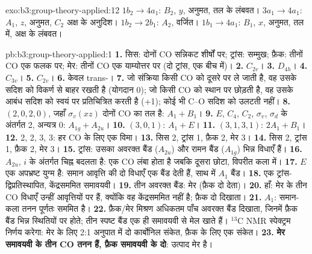 \begin{solution}{exo:b3:group-theory-applied:12}
$1b_2 \to 4a_1$: $B_2$, $y$, अनुमत, तल के लंबवत। $3a_1 \to 4a_1$:
$A_1$, $z$, अनुमत, $C_2$ अक्ष के अनुदिश। $1b_2 \to 2b_1$: $A_2$, वर्जित।
$1b_1 \to 4a_1$: $B_1$, $x$, अनुमत, तल में, अक्ष के लंबवत।
\end{solution}

\begin{solution}{pb:b3:group-theory-applied:1}
\textbf{1.} सिस: दोनों CO सन्निकट शीर्षों पर; ट्रांस: सम्मुख; फ़ैक: तीनों
CO एक फलक पर; मेर: तीनों CO एक याम्योत्तर पर (दो ट्रांस, एक बीच में)।
\textbf{2.} $C_{2v}$।
\textbf{3.} $D_{4h}$।
\textbf{4.} $C_{3v}$।
\textbf{5.} $C_{2v}$।
\textbf{6.} केवल trans-।
\textbf{7.} जो संक्रिया किसी CO को दूसरे पर ले जाती है, वह उसके सदिश को
विकर्ण से बाहर रखती है (योगदान 0); जो किसी CO को स्थान पर छोड़ती है, वह उसके आबंध सदिश को
स्वयं पर प्रतिचित्रित करती है (+1); कोई भी C--O सदिश को उलटती नहीं।
\textbf{8.}  $(2, 0, 2, 0)$, जहाँ $\sigma_v(xz)$ दोनों CO का तल है: $A_1 +
B_1$।
\textbf{9.} $E$, $C_4$, $C_2$, $\sigma_v$, $\sigma_d$ के अंतर्गत  2, अन्यत्र 0:
$A_{1g} + A_{2u}$।
\textbf{10.} $(3, 0, 1)$: $A_1 + E$।
\textbf{11.} $(3, 1, 3, 1)$: $2A_1 + B_1$।
\textbf{12.} 2, 2, 3, 3: हर CO के लिए एक विमा।
\textbf{13.} सिस 2, ट्रांस 1, फ़ैक 2, मेर 3।
\textbf{14.} सिस 2, ट्रांस 1, फ़ैक 2, मेर 3।
\textbf{15.} ट्रांस: उसका अवरक्त बैंड ($A_{2u}$) और रामन बैंड ($A_{1g}$) भिन्न
विधाएँ हैं।
\textbf{16.} $A_{2u}$, $i$ के अंतर्गत चिह्न बदलता है: एक CO लंबा होता है जबकि दूसरा
छोटा, विपरीत कला में।
\textbf{17.} $E$ एक अपभ्रष्ट युग्म है: समान आवृत्ति की दो विधाएँ एक
बैंड देती हैं, साथ में $A_1$ बैंड।
\textbf{18.} एक ट्रांस-द्विप्रतिस्थापित, केंद्रसममित समावयवी।
\textbf{19.} तीन अवरक्त बैंड: मेर (फ़ैक दो देता)।
\textbf{20.} हाँ: मेर के तीन  CO विधाएँ उन्हीं आवृत्तियों पर हैं,
क्योंकि वह केंद्रसममित नहीं है; फ़ैक दो दिखाता।
\textbf{21.} $A_1$: समान-कला तनन पूर्णतः सममित है।
\textbf{22.} फ़ैक/मेर मिश्रण अधिकतम पाँच अवरक्त बैंड दिखाता, जिनमें फ़ैक
बैंड भिन्न स्थितियों पर होते; तीन स्पष्ट बैंड एक ही समावयवी से मेल खाते हैं।
${}^{13}$C NMR स्पेक्ट्रम निर्णय करेगा: मेर के लिए 2:1 अनुपात में दो कार्बोनिल
संकेत, फ़ैक के लिए एक संकेत।
\textbf{23.} \textbf{मेर समावयवी के तीन  CO तनन हैं, फ़ैक
समावयवी के दो}: उत्पाद मेर है।
\end{solution}
